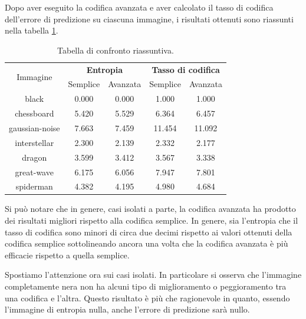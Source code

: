 \noindent Dopo aver eseguito la codifica avanzata e aver calcolato il tasso di codifica dell'errore di predizione su ciascuna immagine, i risultati ottenuti sono riassunti nella tabella \ref{tab:overall-conclusions}.
\begin{table}[h]
    \centering
    \renewcommand{\arraystretch}{1.5}
    \begin{tabular}{| c | c c | c c |}
        \hline
        \multirow{2}{*}{Immagine} & \multicolumn{2}{c|}{\textbf{Entropia}} & \multicolumn{2}{c|}{\textbf{Tasso di codifica}} \\
        & Semplice & Avanzata & Semplice & Avanzata \\\hline\hline

        black & 0.000 & 0.000 & 1.000 & 1.000 \\
        
        chessboard & 5.420 & 5.529 & 6.364 & 6.457 \\
        
        gaussian-noise & 7.663 & 7.459 & 11.454 & 11.092 \\
        
        interstellar & 2.300 & 2.139 & 2.332 & 2.177 \\
        
        dragon & 3.599 & 3.412 & 3.567 & 3.338 \\
        
        great-wave & 6.175 & 6.056 & 7.947 & 7.801 \\
        
        spiderman & 4.382 & 4.195 & 4.980 & 4.684\\
        \hline
    \end{tabular}
    \caption{Tabella di confronto riassuntiva.}
    \label{tab:overall-conclusions}
    \renewcommand{\arraystretch}{1}
\end{table}
Si può notare che in genere, casi isolati a parte, la codifica avanzata ha prodotto dei risultati migliori rispetto alla codifica semplice. In genere, sia l'entropia che il tasso di codifica sono minori di circa due decimi rispetto ai valori ottenuti della codifica semplice sottolineando ancora una volta che la codifica avanzata è più efficacie rispetto a quella semplice.

Spostiamo l'attenzione ora sui casi isolati. In particolare si osserva che l'immagine completamente nera non ha alcuni tipo di miglioramento o peggioramento tra una codifica e l'altra. Questo risultato è più che ragionevole in quanto, essendo l'immagine di entropia nulla, anche l'errore di predizione sarà nullo.

